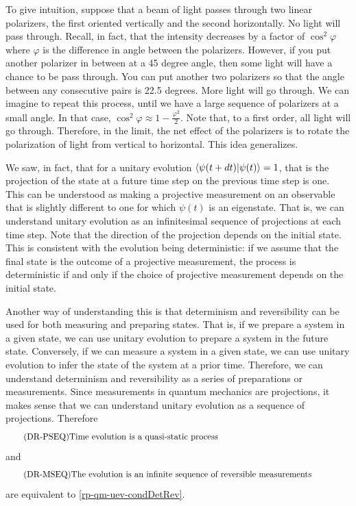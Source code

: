 To give intuition, suppose that a beam of light passes through two linear polarizers, the first oriented vertically and the second horizontally. No light will pass through. Recall, in fact, that the intensity decreases by a factor of $\cos^2 \varphi$ where $\varphi$ is the difference in angle between the polarizers. However, if you put another polarizer in between at a 45 degree angle, then some light will have a chance to be pass through. You can put another two polarizers so that the angle between any consecutive pairs is 22.5 degrees. More light will go through. We can imagine to repeat this process, until we have a large sequence of polarizers at a small angle. In that case, $\cos^2 \varphi \approx 1 - \frac{\varphi^2}{2}$. Note that, to a first order, all light will go through. Therefore, in the limit, the net effect of the polarizers is to rotate the polarization of light from vertical to horizontal. This idea generalizes.

We saw, in fact, that for a unitary evolution $\langle\psi(t+dt) | \psi(t)\rangle =1$, that is the projection of the state at a future time step on the previous time step is one. This can be understood as making a projective measurement on an observable that is slightly different to one for which $\psi(t)$ is an eigenstate. That is, we can understand unitary evolution as an infinitesimal sequence of projections at each time step. Note that the direction of the projection depends on the initial state. This is consistent with the evolution being deterministic: if we assume that the final state is the outcome of a projective measurement, the process is deterministic if and only if the choice of projective measurement depends on the initial state.

Another way of understanding this is that determinism and reversibility can be used for both measuring and preparing states. That is, if we prepare a system in a given state, we can use unitary evolution to prepare a system in the future state. Conversely, if we can measure a system in a given state, we can use unitary evolution to infer the state of the system at a prior time. Therefore, we can understand determinism and reversibility as a series of preparations or measurements. Since measurements in quantum mechanics are projections, it makes sense that we can understand unitary evolution as a sequence of projections. Therefore 
\begin{equation}\label{rp-qm-uev-condProjectionSequence}
	\tag{DR-PSEQ}
	\eqtext{Time evolution is a quasi-static process} 
\end{equation}
and
\begin{equation}\label{rp-qm-uev-condMeasurementSequence}
	\tag{DR-MSEQ}
	\eqtext{The evolution is an infinite sequence of reversible measurements} 
\end{equation}
are equivalent to \ref{rp-qm-uev-condDetRev}.

